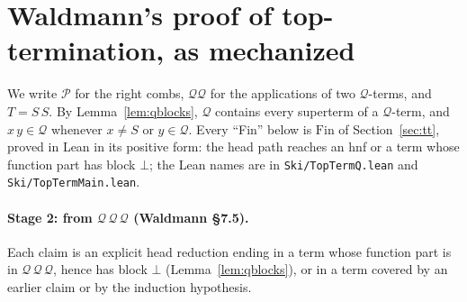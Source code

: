 \documentclass[11pt]{amsart}
\theoremstyle{definition}
\theoremstyle{remark}
\newcommand{\lean}[1]{\texttt{#1}}
\newcommand{\Q}{\mathcal Q}
\newcommand{\Pc}{\mathcal P}
\begin{document}
\appendix
\section{Waldmann's proof of top-termination, as mechanized}\label{app:waldmann}

We write $\Pc$ for the right combs, $\Q\Q$ for the applications of two
$\Q$-terms, and $T=S\,S$. By Lemma~\ref{lem:qblocks}, $\Q$ contains every superterm of a
$\Q$-term, and $x\,y\in\Q$ whenever $x\ne S$ or $y\in\Q$. Every ``Fin'' below is
$\mathrm{Fin}$ of Section~\ref{sec:tt}, proved in Lean in its positive form: the head path
reaches an hnf or a term whose function part has block $\bot$; the Lean names are in \lean{Ski/TopTermQ.lean} and
\lean{Ski/TopTermMain.lean}.

\paragraph{Stage 2: from $\Q\,\Q\,\Q$ (Waldmann \S7.5).} Each claim is an explicit head
reduction ending in a term whose function part is in $\Q\,\Q\,\Q$, hence has block $\bot$
(Lemma~\ref{lem:qblocks}), or in a term covered by an earlier claim or by the induction
hypothesis.
\end{document}

